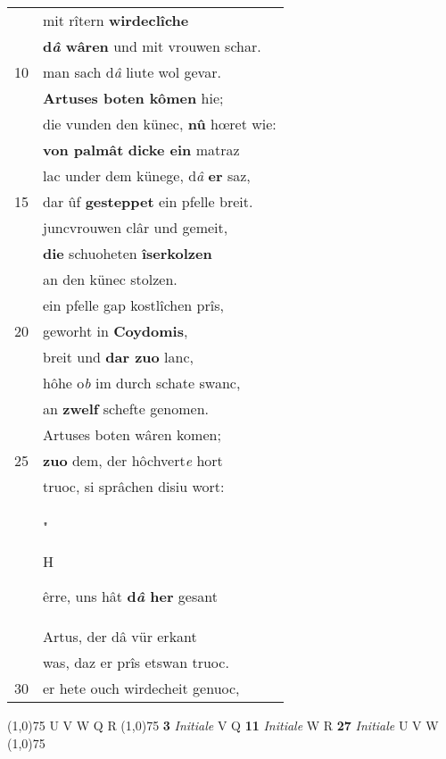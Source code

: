 \documentclass[8pt,a4paper,notitlepage]{article}
\begin{document}
\begin{table}[ht]
\begin{minipage}[t]{0.5\linewidth}
\begin{tabular}{rl}
 & mit rîtern \textbf{wirdeclîche}\\ 
 & \textbf{d\textit{â} wâren} und mit vrouwen schar.\\ 
10 & man sach d\textit{â} liute wol gevar.\\ 
 & \textbf{Artuses boten kômen} hie;\\ 
 & die vunden den künec, \textbf{nû} hœret wie:\\ 
 & \textbf{von palmât} \textbf{dicke ein} matraz\\ 
 & lac under dem künege, d\textit{â} \textbf{er} saz,\\ 
15 & dar ûf \textbf{gesteppet} ein pfelle breit.\\ 
 & juncvrouwen clâr und gemeit,\\ 
 & \textbf{die} schuoheten \textbf{îserkolzen}\\ 
 & an den künec stolzen.\\ 
 & ein pfelle gap kostlîchen prîs,\\ 
20 & geworht in \textbf{Coydomis},\\ 
 & breit und \textbf{dar zuo} lanc,\\ 
 & hôhe o\textit{b} im durch schate swanc,\\ 
 & an \textbf{zwelf} schefte genomen.\\ 
 & Artuses boten wâren komen;\\ 
25 & \textbf{zuo} dem, der hôchvert\textit{e} hort\\ 
 & truoc, si sprâchen disiu wort:\\ 
 & "\begin{large}H\end{large}êrre, uns hât \textbf{d\textit{â} her} gesant\\ 
 & Artus, der dâ vür erkant\\ 
 & was, daz er prîs etswan truoc.\\ 
30 & er hete ouch wirdecheit genuoc,\\ 
\end{tabular}
\scriptsize
\line(1,0){75} \newline
U V W Q R \newline
\line(1,0){75} \newline
\textbf{3} \textit{Initiale} V Q  \textbf{11} \textit{Initiale} W R  \textbf{27} \textit{Initiale} U V W  \newline
\line(1,0){75} \newline

\end{minipage}
\end{table}
\end{document}
